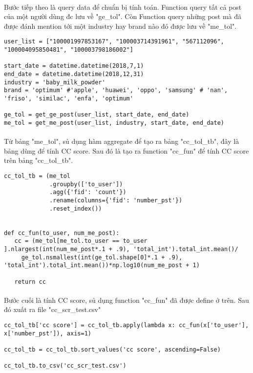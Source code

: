 \documentclass[12pt]{article}
\numberwithin{equation}{section}
\begin{document}
\paragraph{} Bước tiếp theo là query data để chuẩn bị tính toán. Function query tất cả post của một người dùng đc lưu về "ge\_tol". Còn Function query những post mà đã được đánh mention tới một industry hay brand nào đó được lưu về "me\_tol".

\begin{lstlisting}
user_list = ["100001997853167", "100003714391961", "567112096", "100004095850481", "100003798186002"]

start_date = datetime.datetime(2018,7,1)
end_date = datetime.datetime(2018,12,31)
industry = 'baby_milk_powder'
brand = 'optimum' #'apple', 'huawei', 'oppo', 'samsung' # 'nan', 'friso', 'similac', 'enfa', 'optimum'

ge_tol = get_ge_post(user_list, start_date, end_date)
me_tol = get_me_post(user_list, industry, start_date, end_date)
\end{lstlisting}

\paragraph{} Từ bảng "me\_tol", sủ dụng hàm aggregate để tạo ra bảng "cc\_tol\_tb", đây là bảng dùng để tính CC score. Sau đó là tạo ra function "cc\_fun" để tính CC score trên bảng "cc\_tol\_tb".

\begin{lstlisting}
cc_tol_tb = (me_tol
             .groupby(['to_user'])
             .agg({'fid': 'count'})
             .rename(columns={'fid': 'number_pst'})
             .reset_index())


def cc_fun(to_user, num_me_post):
   cc = (me_tol[me_tol.to_user == to_user ].nlargest(int(num_me_post*.1 + .9), 'total_int').total_int.mean()/
     ge_tol.nsmallest(int(ge_tol.shape[0]*.1 + .9), 'total_int').total_int.mean())*np.log10(num_me_post + 1)

   return cc
\end{lstlisting}

\paragraph{} Bước cuối là tính CC score, sủ dụng function "cc\_fun" đã được define ở trên. Sau đó xuất ra file "cc\_scr\_test.csv"

\begin{lstlisting}
cc_tol_tb['cc score'] = cc_tol_tb.apply(lambda x: cc_fun(x['to_user'], x['number_pst']), axis=1)

cc_tol_tb = cc_tol_tb.sort_values('cc score', ascending=False)

cc_tol_tb.to_csv('cc_scr_test.csv')
\end{lstlisting}



\nocite{*}


\end{document}
